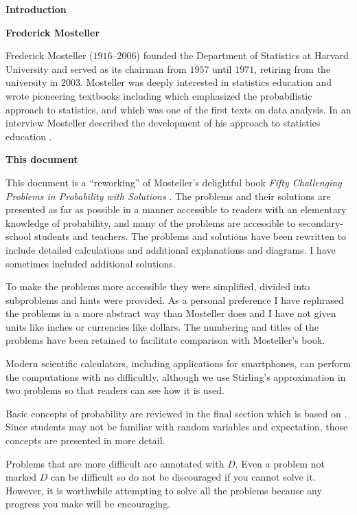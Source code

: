 \begin{NoHyper}
\begin{center}
\textbf{\LARGE Introduction}
\end{center}


\bigskip

\textbf{Frederick Mosteller}

Frederick Mosteller ($1916$--$2006$) founded the Department of Statistics at Harvard University and served as its chairman from $1957$ until $1971$, retiring from the university in $2003$. Mosteller was deeply interested in statistics education and wrote pioneering textbooks including \cite{pwsa} which emphasized the probabilistic approach to statistics, and \cite{bsda} which was one of the first texts on data analysis. In an interview Mosteller described the development of his approach to statistics education \cite{gse}.

\textbf{This document}

This document is a ``reworking'' of Mosteller's delightful book \textit{Fifty Challenging Problems in Probability with Solutions} \cite{fifty}. The problems and their solutions are presented as far as possible in a manner accessible to readers with an elementary knowledge of probability, and many of the problems are accessible to secondary-school students and teachers. The problems and solutions have been rewritten to include detailed calculations and additional explanations and diagrams. I have sometimes included additional solutions.

To make the problems more accessible they were simplified, divided into subproblems and hints were provided. As a personal preference I have rephrased the problems in a more abstract way than Mosteller does and I have not given units like inches or currencies like dollars. The numbering and titles of the problems have been retained to facilitate comparison with Mosteller's book.

Modern scientific calculators, including applications for smartphones, can perform the computations with no difficultly, although we use Stirling's approximation in two problems so that readers can see how it is used.

Basic concepts of probability are reviewed in the final section which is based on \cite{ross}. Since students may not be familiar with random variables and expectation, those concepts are presented in more detail.

Problems that are more difficult are annotated with $D$. Even a problem not marked $D$ can be difficult so do not be discouraged if you cannot solve it. However, it is worthwhile attempting to solve all the problems because any progress you make will be encouraging.

\end{NoHyper}

